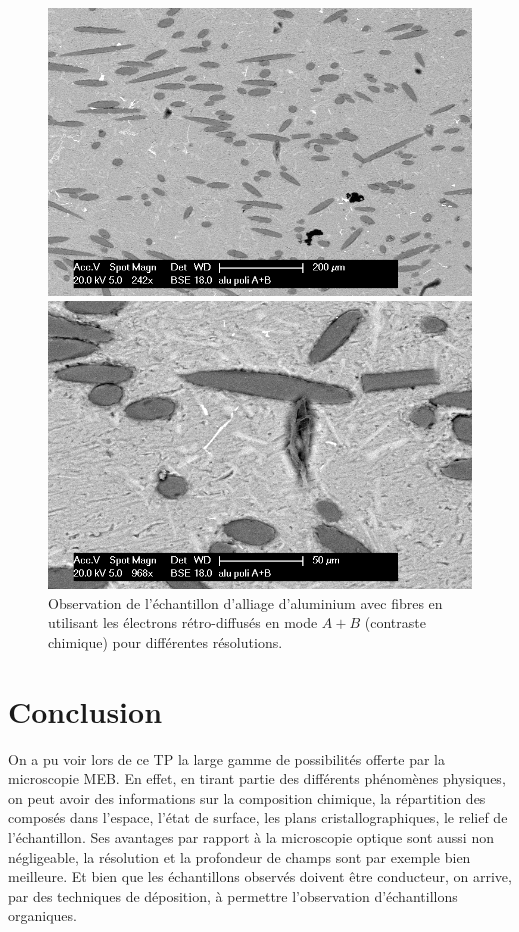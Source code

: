 \documentclass[a4paper,12pt]{article}
\begin{document}
\begin{figure}
\begin{minipage}[c]{.55\linewidth}
\centering
\includegraphics[width=1\textwidth]{images/alu_er_apb.png}
 \end{minipage}\hfill
\begin{minipage}[c]{.55\linewidth}
\centering
\includegraphics[width=1\textwidth]{images/alu_er_apb_g.png}
\end{minipage}
\caption{Observation de l'échantillon d'alliage d'aluminium avec fibres en utilisant les électrons rétro-diffusés en mode $A+B$ (contraste chimique) pour différentes résolutions.}
\label{fig:alu_poli_a+b}
\end{figure}

\section*{Conclusion}

On a pu voir lors de ce TP la large gamme de possibilités offerte par la microscopie MEB. En effet, en tirant partie des différents phénomènes physiques, on peut avoir des informations sur la composition chimique, la répartition des composés dans l'espace, l'état de surface, les plans cristallographiques, le relief de l'échantillon. Ses avantages par rapport à la microscopie optique sont aussi non négligeable, la résolution et la profondeur de champs sont par exemple bien meilleure. Et bien que les échantillons observés doivent être conducteur, on arrive, par des techniques de déposition, à permettre l'observation d'échantillons organiques.
\end{document}
